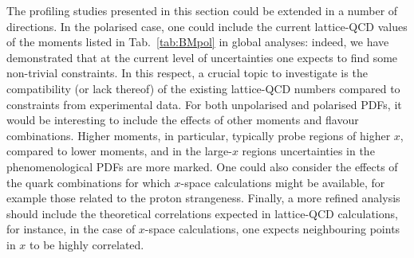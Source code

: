 The profiling studies presented in this section could be extended in
a number of directions.
%
In the polarised case, one could include the current lattice-QCD
values of the moments listed in Tab.~\ref{tab:BMpol} in global analyses: indeed,
we have demonstrated that at the current level of uncertainties one expects
to find some non-trivial constraints.
%
In this respect, a crucial topic to investigate is the compatibility (or lack thereof)
of the existing lattice-QCD numbers compared to constraints from experimental data.
%
For both unpolarised and polarised PDFs, it would be interesting to include the effects
of other moments and flavour combinations.
%
Higher moments, in particular, typically probe regions of higher $x$, compared
to lower moments, and in the large-$x$ regions uncertainties in the phenomenological PDFs are
more marked.
%
One could also consider the effects of the quark combinations for which $x$-space
calculations might be available, for example those related to the proton strangeness.
%
Finally, a more refined analysis should include the theoretical correlations
expected in lattice-QCD calculations, for instance, in the case of $x$-space calculations,
one expects neighbouring points in $x$ to be highly correlated.

